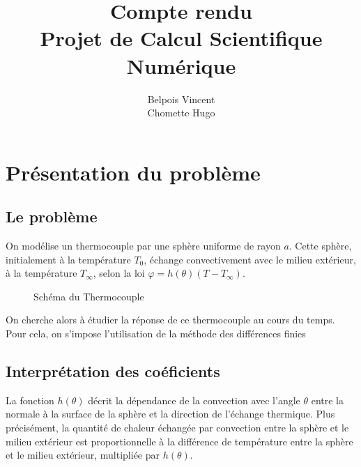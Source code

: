 \documentclass[fleqn]{article}
\title{Compte rendu\\ Projet de Calcul Scientifique Numérique}
\author{Belpois Vincent \\ Chomette Hugo}
\date{}
\renewcommand{\phi}{\varphi}
\begin{document}
\maketitle
\newpage

\tableofcontents
\newpage

\section{Présentation du problème}
\subsection{Le problème}
On modélise un thermocouple par une sphère uniforme de rayon $a$. Cette sphère, initialement à la température $T_0$, échange convectivement avec le milieu extérieur, à la température $T_\infty$, selon la loi $\phi = h(\theta) ( T - T_\infty)$. 
\begin{figure}[H]
    \centering
    \caption{Schéma du Thermocouple}
\end{figure}


On cherche alors à étudier la réponse de ce thermocouple au cours du temps. Pour cela, on s'impose l'utilisation de la méthode des différences finies


\subsection{Interprétation des coéficients}
La fonction $h(\theta)$ décrit la dépendance de la convection avec l'angle $\theta$ entre la normale à la surface de la sphère et la direction de l'échange thermique. Plus précisément, la quantité de chaleur échangée par convection entre la sphère et le milieu extérieur est proportionnelle à la différence de température entre la sphère et le milieu extérieur, multipliée par $h(\theta)$.
\end{document}
